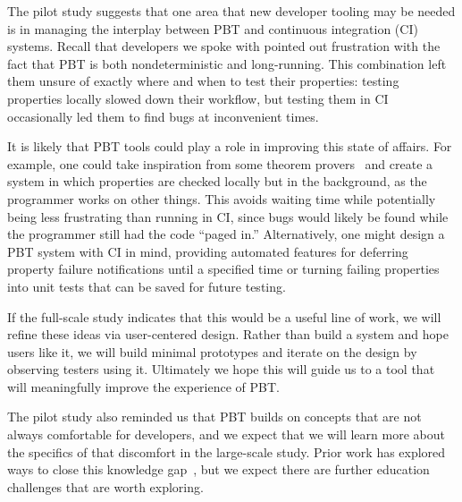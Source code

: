  


The pilot study suggests that one area that new developer tooling may be
needed is in managing the interplay between PBT and continuous integration (CI)
systems. Recall that developers we spoke with pointed out frustration with the
fact that PBT is both nondeterministic and long-running. This combination left
them unsure of exactly where and when to test their properties: testing
properties locally slowed down their workflow, but testing them in CI
occasionally led them to find bugs at inconvenient times.

It is likely that PBT tools could play a role in improving this state of
affairs. For example, one could take inspiration from some theorem
provers~\cite{berghofer2004random} and create a system in which properties are
checked locally but in the background, as the programmer works on other things.
This avoids waiting time while potentially being less frustrating than running
in CI, since bugs would likely be found while the programmer still had the code
``paged in.'' Alternatively, one might design a PBT system with CI in mind,
providing automated features for deferring property failure notifications until
a specified time or turning failing properties into unit tests that can be saved
for future testing.

If the full-scale study indicates that this would be a useful line of work, we
will refine these ideas via user-centered design. Rather than build a system and
hope users like it, we will build minimal prototypes and iterate on the design
by observing testers using it. Ultimately we hope this will guide us to a tool
that will meaningfully improve the experience of PBT.

\label{sec:ed}

The pilot study also reminded us that PBT builds on concepts that are not
always comfortable for developers, and we expect that we will learn more about
the specifics of that discomfort in the large-scale study.  Prior work has
explored ways to close this knowledge
gap~\cite{wrenn2021using,nelson2021automated}, but we expect there are further
education challenges that are worth exploring.


